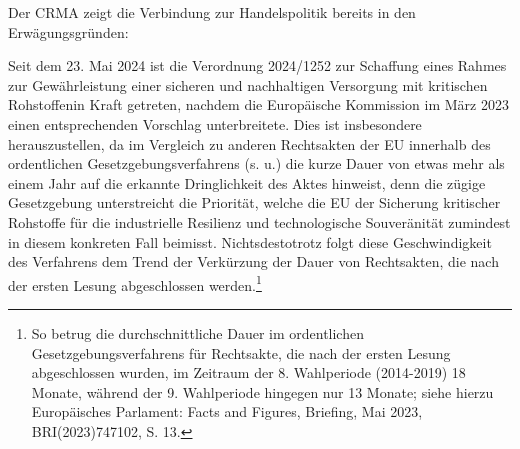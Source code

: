 \documentclass[12pt,a4paper,oneside]{book} %
\begin{document}
Der CRMA zeigt die Verbindung zur Handelspolitik bereits in den Erwägungsgründen: 



Seit dem 23. Mai 2024 ist die Verordnung 2024/1252 \glqq zur Schaffung eines Rahmes zur Gewährleistung einer sicheren und nachhaltigen Versorgung mit kritischen Rohstoffen\grqq in Kraft getreten, nachdem die Europäische Kommission im März 2023 einen entsprechenden Vorschlag unterbreitete. Dies ist insbesondere herauszustellen, da im Vergleich zu anderen Rechtsakten der EU innerhalb des ordentlichen Gesetzgebungsverfahrens (s. u.) die kurze Dauer von etwas mehr als einem Jahr auf die erkannte Dringlichkeit des Aktes hinweist, denn die zügige Gesetzgebung unterstreicht die Priorität, welche die EU der Sicherung kritischer Rohstoffe für die industrielle Resilienz und technologische Souveränität zumindest in diesem konkreten Fall beimisst. Nichtsdestotrotz folgt diese Geschwindigkeit des Verfahrens dem Trend der Verkürzung der Dauer von Rechtsakten, die nach der ersten Lesung abgeschlossen werden.\footnote{So betrug die durchschnittliche Dauer im ordentlichen Gesetzgebungsverfahrens für Rechtsakte, die nach der ersten Lesung abgeschlossen wurden, im Zeitraum der 8. Wahlperiode (2014-2019) 18 Monate, während der 9. Wahlperiode hingegen nur 13 Monate; siehe hierzu Europäisches Parlament: Facts and Figures, Briefing, Mai 2023, BRI(2023)747102, S. 13.} 
	
\end{document}
